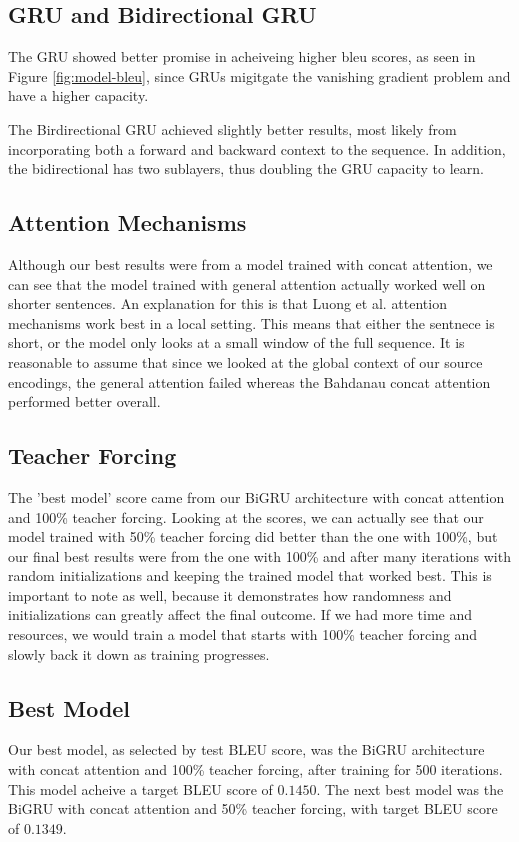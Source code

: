 \documentclass[twoside,twocolumn]{article}
\begin{document}
\subsection{GRU and Bidirectional GRU}
The GRU showed better promise in acheiveing higher bleu scores, as seen in
Figure \ref{fig:model-bleu}, since GRUs migitgate the vanishing gradient
problem and have a higher capacity.

The Birdirectional GRU achieved slightly better results, most likely from
incorporating both a forward and backward context to the sequence. In addition,
the bidirectional has two sublayers, thus doubling the GRU capacity to learn.

\subsection{Attention Mechanisms}
Although our best results were from a model trained with concat attention, we
can see that the model trained with general attention actually worked well on
shorter sentences. An explanation for this is that Luong et al.
\cite{luong2015effective} attention mechanisms work best in a local setting.
This means that either the sentnece is short, or the model only looks at a
small window of the full sequence. It is reasonable to assume that since we
looked at the global context of our source encodings, the general attention
failed whereas the Bahdanau \cite{bahdanau2014neural} concat attention
performed better overall.

\subsection{Teacher Forcing}
The 'best model' score came from our BiGRU architecture with concat attention
and 100\% teacher forcing. Looking at the scores, we can actually see that our
model trained with 50\% teacher forcing did better than the one with 100\%, but
our final best results were from the one with 100\% and after many iterations
with random initializations and keeping the trained model that worked best.
This is important to note as well, because it demonstrates how randomness and
initializations can greatly affect the final outcome. If we had more time and
resources, we would train a model that starts with 100\% teacher forcing and
slowly back it down as training progresses.

\subsection{Best Model}
Our best model, as selected by test BLEU score, was the BiGRU architecture
with concat attention and 100\% teacher forcing, after training for 500
iterations. This model acheive a target BLEU score of $0.1450$. The next best
model was the BiGRU with concat attention and 50\% teacher forcing, with target
BLEU score of $0.1349$.
\end{document}
